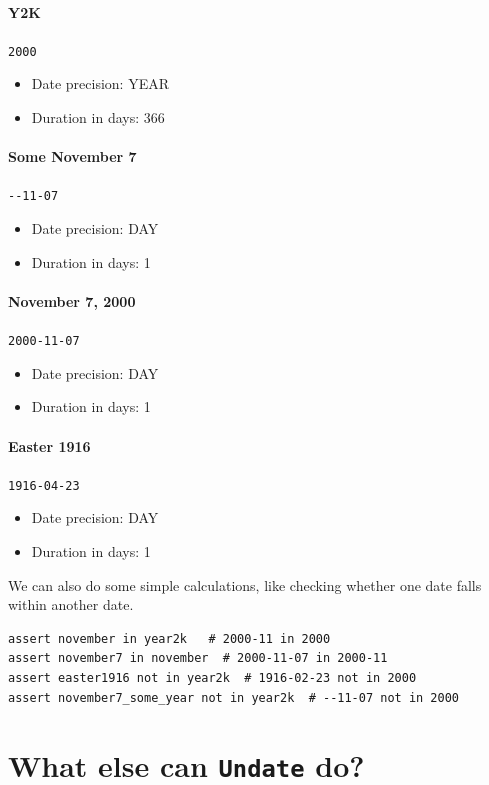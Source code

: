 \documentclass{anthology-ch}         %
\begin{document}
\paragraph{Y2K} \texttt{2000}
\begin{itemize}
    \item Date precision: YEAR
    \item Duration in days: 366
\end{itemize}

\paragraph{Some November 7} \texttt{-}\texttt{-11-07}
\begin{itemize}
   \item  Date precision: DAY
   \item Duration in days: 1
\end{itemize}

\paragraph{November 7, 2000} \texttt{2000-11-07}
\begin{itemize}
    \item Date precision: DAY
    \item Duration in days: 1
\end{itemize}

\paragraph{Easter 1916} \texttt{1916-04-23}
\begin{itemize}
    \item Date precision: DAY
    \item Duration in days: 1
\end{itemize}

We can also do some simple calculations, like checking whether one date falls within another date.
\begin{verbatim}
assert november in year2k   # 2000-11 in 2000
assert november7 in november  # 2000-11-07 in 2000-11
assert easter1916 not in year2k  # 1916-02-23 not in 2000
assert november7_some_year not in year2k  # --11-07 not in 2000
\end{verbatim}

\section{What else can \texttt{Undate} do?}
\end{document}
